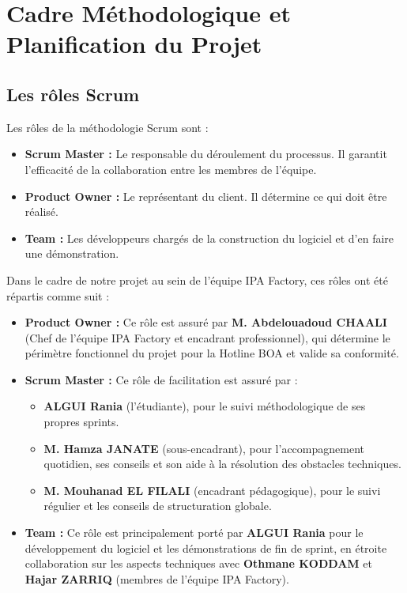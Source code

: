 
\section{Cadre Méthodologique et Planification du Projet}
\label{sec:cadre_methodologique}

\subsection{Les rôles Scrum}
\label{subsec:roles_scrum}

Les rôles de la méthodologie Scrum sont :
\begin{itemize}
    \item \textbf{Scrum Master :} Le responsable du déroulement du processus. Il garantit l’efficacité de la collaboration entre les membres de l’équipe.
    \item \textbf{Product Owner :} Le représentant du client. Il détermine ce qui doit être réalisé.
    \item \textbf{Team :} Les développeurs chargés de la construction du logiciel et d’en faire une démonstration.
\end{itemize}

Dans le cadre de notre projet au sein de l'équipe IPA Factory, ces rôles ont été répartis comme suit :
\begin{itemize}
    \item \textbf{Product Owner :} Ce rôle est assuré par \textbf{M. Abdelouadoud CHAALI} (Chef de l’équipe IPA Factory et encadrant professionnel), qui détermine le périmètre fonctionnel du projet pour la Hotline BOA et valide sa conformité.
    \item \textbf{Scrum Master :} Ce rôle de facilitation est assuré par :
    \begin{itemize}
        \item \textbf{ALGUI Rania} (l'étudiante), pour le suivi méthodologique de ses propres sprints.
        \item \textbf{M. Hamza JANATE} (sous-encadrant), pour l'accompagnement quotidien, ses conseils et son aide à la résolution des obstacles techniques.
        \item \textbf{M. Mouhanad EL FILALI} (encadrant pédagogique), pour le suivi régulier et les conseils de structuration globale.
    \end{itemize}
    \item \textbf{Team :} Ce rôle est principalement porté par \textbf{ALGUI Rania} pour le développement du logiciel et les démonstrations de fin de sprint, en étroite collaboration sur les aspects techniques avec \textbf{Othmane KODDAM} et \textbf{Hajar ZARRIQ} (membres de l'équipe IPA Factory).
\end{itemize}


